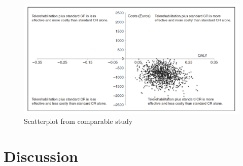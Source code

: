 \begin{figure}[H]
\centering
\includegraphics[width=1\textwidth]{Figure/scatter.png}
\caption{Scatterplot from comparable study \cite{costeffect}}
\label{fig:scatter}
\end{figure} 

\chapter{Discussion}

